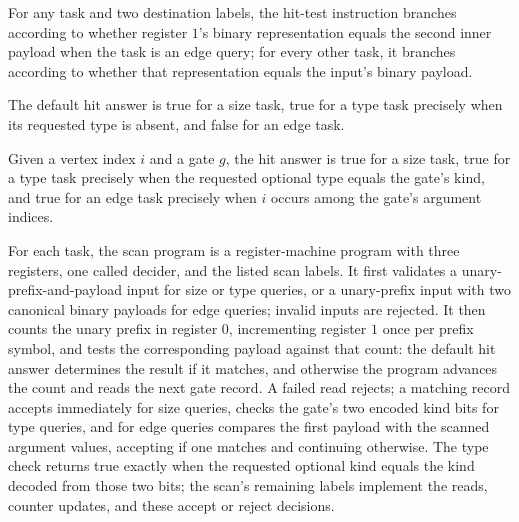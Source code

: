\begin{definition}
\label{BoolCircuit.AdjScan.hit}
\leanok
{}
For any task and two destination labels, the hit-test instruction branches according to
whether register $1$'s binary representation equals the second inner payload when the
task is an edge query; for every other task, it branches according to whether that
representation equals the input's binary payload.
\end{definition}

\begin{definition}
\label{BoolCircuit.AdjScan.nAns}
\leanok
{}
The default hit answer is true for a size task, true for a type task precisely when its
requested type is absent, and false for an edge task.
\end{definition}

\begin{definition}
\label{BoolCircuit.AdjScan.hitAns}
\leanok
{}
Given a vertex index $i$ and a gate $g$, the hit answer is true for a size task, true
for a type task precisely when the requested optional type equals the gate's kind, and
true for an edge task precisely when $i$ occurs among the gate's argument indices.
\end{definition}

\begin{definition}
\label{BoolCircuit.AdjScan.scan}
\leanok
{}
For each task, the scan program is a register-machine program with three registers, one
called decider, and the listed scan labels. It first validates a
unary-prefix-and-payload input for size or type queries, or a unary-prefix input with
two canonical binary payloads for edge queries; invalid inputs are rejected. It then
counts the unary prefix in register $0$, incrementing register $1$ once per prefix
symbol, and tests the corresponding payload against that count: the default hit answer
determines the result if it matches, and otherwise the program advances the count and
reads the next gate record. A failed read rejects; a matching record accepts immediately
for size queries, checks the gate's two encoded kind bits for type queries, and for edge
queries compares the first payload with the scanned argument values, accepting if one
matches and continuing otherwise. The type check returns true exactly when the requested
optional kind equals the kind decoded from those two bits; the scan's remaining labels
implement the reads, counter updates, and these accept or reject decisions.
\end{definition}

